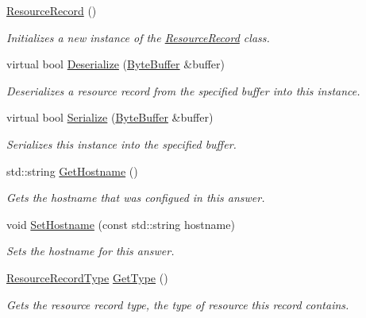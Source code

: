 \begin{DoxyCompactItemize}
\item 
\hyperlink{class_senergy_1_1_dns_1_1_resource_record_a5031132589becf3c4e8e4ecbd6ab4e5d}{Resource\-Record} ()
\begin{DoxyCompactList}\small\item\em Initializes a new instance of the \hyperlink{class_senergy_1_1_dns_1_1_resource_record}{Resource\-Record} class. \end{DoxyCompactList}\item 
virtual bool \hyperlink{class_senergy_1_1_dns_1_1_resource_record_a4426ad69fd06a352835b00d18fd726a7}{Deserialize} (\hyperlink{class_senergy_1_1_byte_buffer}{Byte\-Buffer} \&buffer)
\begin{DoxyCompactList}\small\item\em Deserializes a resource record from the specified buffer into this instance. \end{DoxyCompactList}\item 
virtual bool \hyperlink{class_senergy_1_1_dns_1_1_resource_record_ad76b4f450fc1d7f0bd0bbf72c3f68a11}{Serialize} (\hyperlink{class_senergy_1_1_byte_buffer}{Byte\-Buffer} \&buffer)
\begin{DoxyCompactList}\small\item\em Serializes this instance into the specified buffer. \end{DoxyCompactList}\item 
std\-::string \hyperlink{class_senergy_1_1_dns_1_1_resource_record_a98a7d65be5a756f190247e18a5433661}{Get\-Hostname} ()
\begin{DoxyCompactList}\small\item\em Gets the hostname that was configued in this answer. \end{DoxyCompactList}\item 
void \hyperlink{class_senergy_1_1_dns_1_1_resource_record_a571a18bfcdcc2e5ac0faa2e9cfac57fb}{Set\-Hostname} (const std\-::string hostname)
\begin{DoxyCompactList}\small\item\em Sets the hostname for this answer. \end{DoxyCompactList}\item 
\hyperlink{namespace_senergy_1_1_dns_a590bfd748c955364770f5ce358d9dfe0}{Resource\-Record\-Type} \hyperlink{class_senergy_1_1_dns_1_1_resource_record_a53ff0c81f7f0b79ac69df28a513242e2}{Get\-Type} ()
\begin{DoxyCompactList}\small\item\em Gets the resource record type, the type of resource this record contains. \end{DoxyCompactList}\item 

\end{DoxyCompactItemize}
